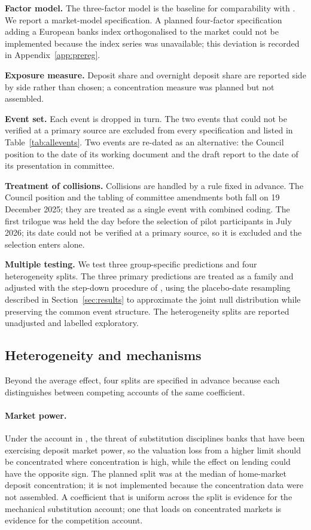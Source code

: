 \documentclass[11pt]{article}
\theoremstyle{plain}\newtheorem{proposition}{Proposition}
\begin{document}
\textbf{Factor model.} The three-factor model is the baseline for comparability with \citet{burlon2024}. We report a market-model specification. A planned four-factor specification adding a European banks index orthogonalised to the market could not be implemented because the index series was unavailable; this deviation is recorded in Appendix~\ref{app:prereg}.

\textbf{Exposure measure.} Deposit share and overnight deposit share are reported side by side rather than chosen; a concentration measure was planned but not assembled.

\textbf{Event set.} Each event is dropped in turn. The two events that could not be verified at a primary source are excluded from every specification and listed in Table~\ref{tab:allevents}. Two events are re-dated as an alternative: the Council position to the date of its working document and the draft report to the date of its presentation in committee.

\textbf{Treatment of collisions.} Collisions are handled by a rule fixed in advance. The Council position and the tabling of committee amendments both fall on 19 December 2025; they are treated as a single event with combined coding. The first trilogue was held the day before the selection of pilot participants in July 2026; its date could not be verified at a primary source, so it is excluded and the selection enters alone.

\textbf{Multiple testing.} We test three group-specific predictions and four heterogeneity splits. The three primary predictions are treated as a family and adjusted with the step-down procedure of \citet{romano2005}, using the placebo-date resampling described in Section~\ref{sec:results} to approximate the joint null distribution while preserving the common event structure. The heterogeneity splits are reported unadjusted and labelled exploratory.

\subsection{Heterogeneity and mechanisms}\label{sec:hetero}

Beyond the average effect, four splits are specified in advance because each distinguishes between competing accounts of the same coefficient.

\paragraph{Market power.} Under the account in \citet{chiu2023}, the threat of substitution disciplines banks that have been exercising deposit market power, so the valuation loss from a higher limit should be concentrated where concentration is high, while the effect on lending could have the opposite sign. The planned split was at the median of home-market deposit concentration; it is not implemented because the concentration data were not assembled. A coefficient that is uniform across the split is evidence for the mechanical substitution account; one that loads on concentrated markets is evidence for the competition account.
\end{document}
